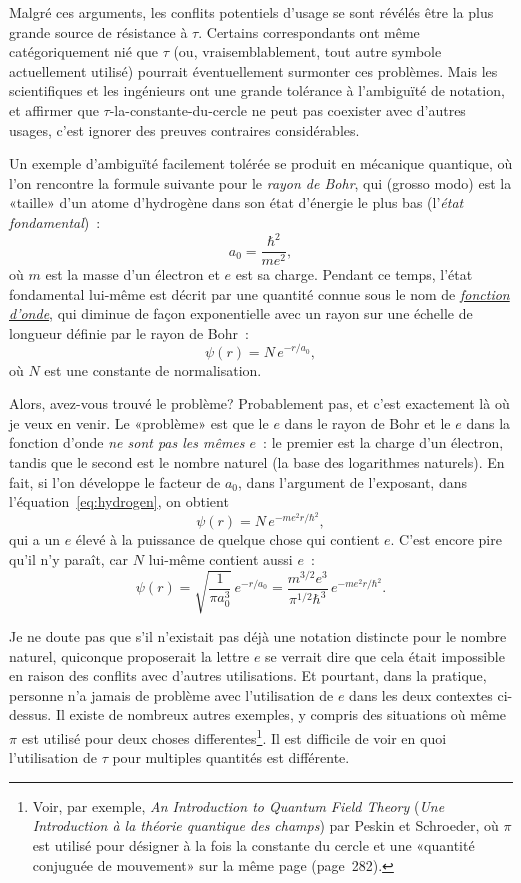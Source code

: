 Malgré ces arguments, les conflits potentiels d'usage se sont révélés être
la plus grande source de résistance à $\tau$. Certains correspondants ont même
catégoriquement nié que $\tau$ (ou, vraisemblablement, tout autre symbole
actuellement utilisé) pourrait éventuellement surmonter ces problèmes. Mais les
scientifiques et les ingénieurs ont une grande tolérance à l'ambiguïté de
notation, et affirmer que $\tau$-la-constante-du-cercle ne peut pas coexister
avec d'autres usages, c'est ignorer des preuves contraires considérables.

Un exemple d'ambiguïté facilement tolérée se produit en mécanique quantique, où
l'on rencontre la formule suivante pour le \emph{rayon de Bohr}, qui (grosso
modo) est la «\ns taille\ns » d'un atome d'hydrogène dans son état d'énergie le
plus bas (l'\emph{état fondamental})~:
\[
a_0 = \frac{\hbar^2}{m e^2},
\]
où $m$ est la masse d'un électron et $e$ est sa charge. Pendant ce temps, l'état
fondamental lui-même est décrit par une quantité connue sous le nom de
\href{https://fr.wikipedia.org/wiki/Fonction_d%27onde}{\emph{fonction d'onde}},
qui diminue de façon exponentielle avec un rayon sur une échelle de longueur
définie par le rayon de Bohr~:
\begin{equation}
\label{eq:hydrogen}
\psi(r) = N\,e^{-r/a_0},
\end{equation}
où $N$ est une constante de normalisation.

Alors, avez-vous trouvé le problème\ns? Probablement pas, et c'est exactement là où je veux en
venir. Le «\ns problème\ns » est que le $e$ dans le rayon de Bohr et le $e$ dans la
fonction d'onde \emph{ne sont pas les mêmes $e$}~: le premier est la charge
d'un électron, tandis que le second est le nombre naturel (la base des logarithmes
naturels). En fait, si l'on développe le facteur de $a_0$, dans l'argument de
l'exposant, dans l'équation~\eqref{eq:hydrogen}, on obtient
\[
\psi(r) = N\,e^{-m e^2 r/\hbar^2},
\]
qui a un $e$ élevé à la puissance de quelque chose qui contient $e$. C'est
encore pire qu'il n'y paraît, car $N$ lui-même contient aussi $e$~:
\[
\psi(r) = \sqrt{\frac{1}{\pi a_0^3}}\,e^{-r/a_0} =
\frac{m^{3/2} e^3}{\pi^{1/2} \hbar^3}\,e^{-m e^2 r/\hbar^2}.
\]

Je ne doute pas que s'il n'existait pas déjà une notation distincte pour le
nombre naturel, quiconque proposerait la lettre $e$ se verrait dire que cela
était impossible en raison des conflits avec d'autres utilisations. Et pourtant,
dans la pratique, personne n'a jamais de problème avec l'utilisation de $e$ dans
les deux contextes ci-dessus. Il existe de nombreux autres exemples, y compris
des situations où même $\pi$ est utilisé pour deux choses
differentes\ns\footnote{Voir, par exemple, \emph{An Introduction to Quantum Field
Theory} (\emph{Une Introduction à la théorie quantique des champs}) par Peskin
et Schroeder, où $\pi$ est utilisé pour désigner à la fois la constante du
cercle et une «\ns quantité conjuguée de mouvement\ns » sur la même page
(page~282).}. Il est difficile de voir en quoi l'utilisation de $\tau$ pour
multiples quantités est différente.


